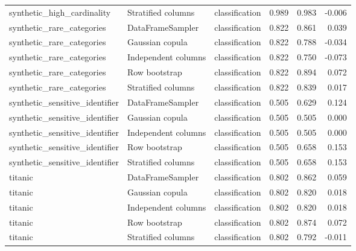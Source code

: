 \begin{table}
\begin{adjustbox}{max width=\textwidth}
\begin{tabular}{lllrrr}
synthetic\_high\_cardinality & Stratified columns & classification & 0.989 & 0.983 & -0.006 \\
synthetic\_rare\_categories & DataFrameSampler & classification & 0.822 & 0.861 & 0.039 \\
synthetic\_rare\_categories & Gaussian copula & classification & 0.822 & 0.788 & -0.034 \\
synthetic\_rare\_categories & Independent columns & classification & 0.822 & 0.750 & -0.073 \\
synthetic\_rare\_categories & Row bootstrap & classification & 0.822 & 0.894 & 0.072 \\
synthetic\_rare\_categories & Stratified columns & classification & 0.822 & 0.839 & 0.017 \\
synthetic\_sensitive\_identifier & DataFrameSampler & classification & 0.505 & 0.629 & 0.124 \\
synthetic\_sensitive\_identifier & Gaussian copula & classification & 0.505 & 0.505 & 0.000 \\
synthetic\_sensitive\_identifier & Independent columns & classification & 0.505 & 0.505 & 0.000 \\
synthetic\_sensitive\_identifier & Row bootstrap & classification & 0.505 & 0.658 & 0.153 \\
synthetic\_sensitive\_identifier & Stratified columns & classification & 0.505 & 0.658 & 0.153 \\
titanic & DataFrameSampler & classification & 0.802 & 0.862 & 0.059 \\
titanic & Gaussian copula & classification & 0.802 & 0.820 & 0.018 \\
titanic & Independent columns & classification & 0.802 & 0.820 & 0.018 \\
titanic & Row bootstrap & classification & 0.802 & 0.874 & 0.072 \\
titanic & Stratified columns & classification & 0.802 & 0.792 & -0.011 \\
\bottomrule
\end{tabular}
\end{adjustbox}
\end{table}
